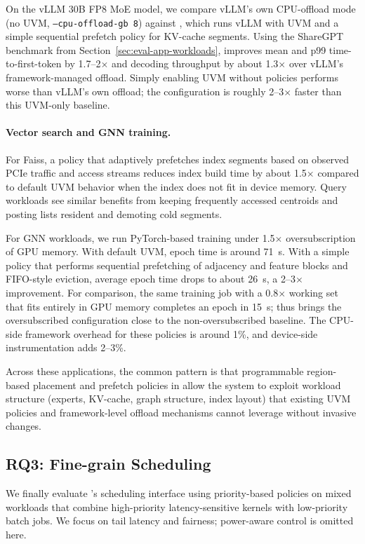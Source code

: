 On the vLLM 30B FP8 MoE model, we compare vLLM's own CPU-offload mode (no UVM,
\texttt{--cpu-offload-gb 8}) against \sys, which runs vLLM with UVM and a
simple sequential prefetch policy for KV-cache segments. Using the ShareGPT
benchmark from Section~\ref{sec:eval-app-workloads}, \sys improves mean and p99
time-to-first-token by 1.7--2$\times$ and decoding throughput by about
1.3$\times$ over vLLM's framework-managed offload. Simply enabling UVM without
\sys policies performs worse than vLLM's own offload; the \sys configuration is
roughly 2--3$\times$ faster than this UVM-only baseline.

\paragraph{Vector search and GNN training.}
For Faiss, a \sys policy that adaptively prefetches index segments based
on observed PCIe traffic and access streams reduces index build time by about
1.5$\times$ compared to default UVM behavior when the index does not fit in
device memory. Query workloads see similar benefits from keeping frequently
accessed centroids and posting lists resident and demoting cold segments.

For GNN workloads, we run PyTorch-based training under 1.5$\times$
oversubscription of GPU memory. With default UVM, epoch time is around 71~s.
With a simple \sys policy that performs sequential prefetching of adjacency and
feature blocks and FIFO-style eviction, average epoch time drops to about 26~s,
a 2--3$\times$ improvement. For comparison, the same training job with a 0.8$\times$
working set that fits entirely in GPU memory completes an epoch in 15~s; \sys
thus brings the oversubscribed configuration close to the non-oversubscribed
baseline. The CPU-side framework overhead for these policies is around 1\%, and
device-side instrumentation adds 2--3\%.

Across these applications, the common pattern is that programmable region-based
placement and prefetch policies in \sys allow the system to exploit workload
structure (experts, KV-cache, graph structure, index layout) that existing UVM
policies and framework-level offload mechanisms cannot leverage without invasive
changes.

\subsection{RQ3: Fine-grain Scheduling}

We finally evaluate \sys's scheduling interface using priority-based policies on
mixed workloads that combine high-priority latency-sensitive kernels with
low-priority batch jobs. We focus on tail latency and fairness; power-aware
control is omitted here.

